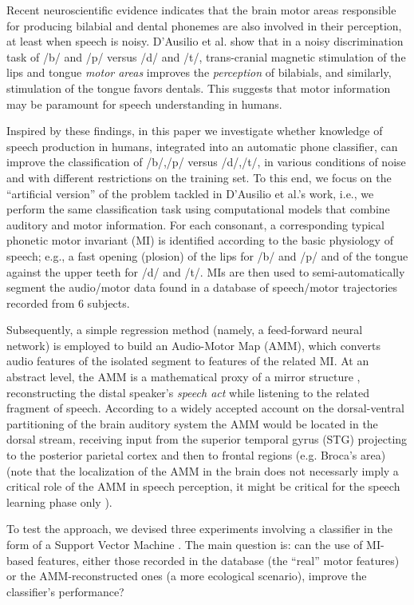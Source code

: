 \documentclass[10pt]{article}
\begin{document}
Recent neuroscientific evidence indicates that the brain motor areas responsible for
producing bilabial and dental phonemes are also involved in their perception, at least
when speech is noisy. D'Ausilio et al. \cite{dausilio}
show that in a noisy discrimination task of /b/ and /p/ versus /d/
and /t/, trans-cranial magnetic stimulation of the lips and tongue \emph{motor areas}
improves the \emph{perception} of bilabials, and similarly, stimulation of the tongue
favors dentals. This suggests that motor information may be paramount for
speech understanding in humans.

Inspired by these findings, in this paper we investigate whether knowledge of speech
production in humans, integrated into an automatic phone classifier, can improve the
classification of /b/,/p/ versus /d/,/t/, in various conditions of noise and with different
restrictions on the training set.
To this end, we focus on the ``artificial version'' of the problem tackled in D'Ausilio et al.'s
work, i.e., we perform the same classification task using computational models that combine 
auditory and motor information. For each consonant, a corresponding typical phonetic motor invariant (MI) is identified
according to the basic physiology of speech; e.g., a fast opening (plosion) of the lips
for /b/ and /p/ and of the tongue against the upper teeth for /d/ and /t/.
MIs are then used to semi-automatically segment the audio/motor data found in a
database of speech/motor trajectories recorded from $6$ subjects.

Subsequently, a simple regression method (namely, a feed-forward neural network) is employed
to build an Audio-Motor Map (AMM), which converts audio features of the isolated segment to
features of the related MI. At an abstract level, the AMM is a mathematical proxy of a mirror
structure \cite{umilta-01,kroger}, reconstructing the distal speaker's \emph{speech act} while
listening to the related fragment of speech. According to a widely accepted account on the 
dorsal-ventral partitioning of the brain auditory system \cite{hickok-00,hickok-04} the AMM would be located 
in the dorsal stream, receiving input from the superior temporal gyrus (STG) projecting to the posterior 
parietal cortex and then to frontal regions (e.g. Broca's area) (note that the localization of the AMM in 
the brain does not necessarly imply a critical role of the AMM in speech perception, it might 
be critical for the speech learning phase only \cite{hickok-04,hickok-11}).

To test the approach, we devised three experiments involving a classifier in the form of a
Support Vector Machine \cite{BGV92}. The main question is: can the use of MI-based features,
either those recorded in the database (the ``real'' motor features) or the AMM-reconstructed
ones (a more ecological scenario), improve the classifier's performance?
\end{document}
